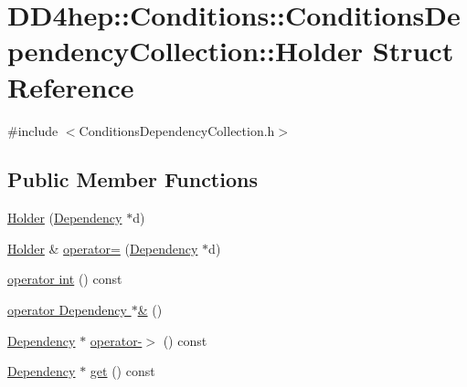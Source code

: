 \hypertarget{struct_d_d4hep_1_1_conditions_1_1_conditions_dependency_collection_1_1_holder}{}\section{D\+D4hep\+:\+:Conditions\+:\+:Conditions\+Dependency\+Collection\+:\+:Holder Struct Reference}
\label{struct_d_d4hep_1_1_conditions_1_1_conditions_dependency_collection_1_1_holder}


{\ttfamily \#include $<$Conditions\+Dependency\+Collection.\+h$>$}

\subsection*{Public Member Functions}
\begin{DoxyCompactItemize}
\item 
\hyperlink{struct_d_d4hep_1_1_conditions_1_1_conditions_dependency_collection_1_1_holder_a2eb63a4f316a695d951a31ef4d230fee}{Holder} (\hyperlink{class_d_d4hep_1_1_conditions_1_1_conditions_dependency_collection_a87252585d3e17ae82813c039b1b47e8a}{Dependency} $\ast$d)
\item 
\hyperlink{struct_d_d4hep_1_1_conditions_1_1_conditions_dependency_collection_1_1_holder}{Holder} \& \hyperlink{struct_d_d4hep_1_1_conditions_1_1_conditions_dependency_collection_1_1_holder_a2a2c20e8415f2366ff083542b73a225a}{operator=} (\hyperlink{class_d_d4hep_1_1_conditions_1_1_conditions_dependency_collection_a87252585d3e17ae82813c039b1b47e8a}{Dependency} $\ast$d)
\item 
\hyperlink{struct_d_d4hep_1_1_conditions_1_1_conditions_dependency_collection_1_1_holder_a486fb723b216007a9bec6cadd7045137}{operator int} () const
\item 
\hyperlink{struct_d_d4hep_1_1_conditions_1_1_conditions_dependency_collection_1_1_holder_ae43b3cf1f6220bcea19b735766b017b0}{operator Dependency $\ast$\&} ()
\item 
\hyperlink{class_d_d4hep_1_1_conditions_1_1_conditions_dependency_collection_a87252585d3e17ae82813c039b1b47e8a}{Dependency} $\ast$ \hyperlink{struct_d_d4hep_1_1_conditions_1_1_conditions_dependency_collection_1_1_holder_aa9dbe25e86303339834ac6307b19dda6}{operator-\/$>$} () const
\item 
\hyperlink{class_d_d4hep_1_1_conditions_1_1_conditions_dependency_collection_a87252585d3e17ae82813c039b1b47e8a}{Dependency} $\ast$ \hyperlink{struct_d_d4hep_1_1_conditions_1_1_conditions_dependency_collection_1_1_holder_acbcdfe4c20b27db03737cc51bcfa3a7c}{get} () const
\end{DoxyCompactItemize}
